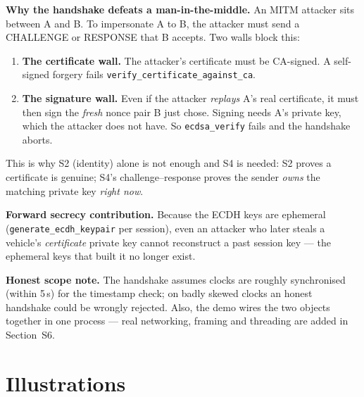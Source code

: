 \documentclass[11pt,a4paper]{report}
\begin{document}
\noindent\textbf{Why the handshake defeats a man-in-the-middle.} An MITM attacker
sits between A and B. To impersonate A to B, the attacker must send a CHALLENGE
or RESPONSE that B accepts. Two walls block this:
\begin{enumerate}
  \item \textbf{The certificate wall.} The attacker's certificate must be
        CA-signed. A self-signed forgery fails
        \texttt{verify\_certificate\_against\_ca}.
  \item \textbf{The signature wall.} Even if the attacker \emph{replays} A's real
        certificate, it must then sign the \emph{fresh} nonce pair B just chose.
        Signing needs A's private key, which the attacker does not have. So
        \texttt{ecdsa\_verify} fails and the handshake aborts.
\end{enumerate}
This is why S2 (identity) alone is not enough and S4 is needed: S2 proves a
certificate is genuine; S4's challenge--response proves the sender \emph{owns}
the matching private key \emph{right now}.

\textbf{Forward secrecy contribution.} Because the ECDH keys are ephemeral
(\texttt{generate\_ecdh\_keypair} per session), even an attacker who later steals
a vehicle's \emph{certificate} private key cannot reconstruct a past session key
--- the ephemeral keys that built it no longer exist.

\textbf{Honest scope note.} The handshake assumes clocks are roughly
synchronised (within 5\,s) for the timestamp check; on badly skewed clocks an
honest handshake could be wrongly rejected. Also, the demo wires the two objects
together in one process --- real networking, framing and threading are added in
Section~S6.

\section{Illustrations}
\end{document}
